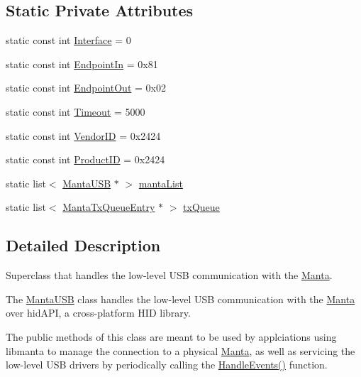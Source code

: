 \subsection*{\-Static \-Private \-Attributes}
\begin{DoxyCompactItemize}
\item 
static const int \hyperlink{classMantaUSB_acde414c7e155d869f5c399518e32d38d}{\-Interface} = 0
\item 
static const int \hyperlink{classMantaUSB_afe5ae885264a5aff980c5c645a3ff9d6}{\-Endpoint\-In} = 0x81
\item 
static const int \hyperlink{classMantaUSB_ab3926f81d0c1b5993d583a34343e0b6d}{\-Endpoint\-Out} = 0x02
\item 
static const int \hyperlink{classMantaUSB_aa2a88b5675ef513922f1bd4748d12181}{\-Timeout} = 5000
\item 
static const int \hyperlink{classMantaUSB_ad3b9f90c7681710d99dd984000a7859e}{\-Vendor\-I\-D} = 0x2424
\item 
static const int \hyperlink{classMantaUSB_aa78f9ab72991bc6ed711e6b823e98a00}{\-Product\-I\-D} = 0x2424
\item 
static list$<$ \hyperlink{classMantaUSB}{\-Manta\-U\-S\-B} $\ast$ $>$ \hyperlink{classMantaUSB_a6c2c001a6d17abfd0f6ab6a6d36ce288}{manta\-List}
\item 
static list$<$ \hyperlink{structMantaUSB_1_1MantaTxQueueEntry}{\-Manta\-Tx\-Queue\-Entry} $\ast$ $>$ \hyperlink{classMantaUSB_ab647636b02371d10ccedaf719b6b7de2}{tx\-Queue}
\end{DoxyCompactItemize}


\subsection{\-Detailed \-Description}
\-Superclass that handles the low-\/level \-U\-S\-B communication with the \hyperlink{classManta}{\-Manta}. 

\-The \hyperlink{classMantaUSB}{\-Manta\-U\-S\-B} class handles the low-\/level \-U\-S\-B communication with the \hyperlink{classManta}{\-Manta} over hid\-A\-P\-I, a cross-\/platform \-H\-I\-D library.

\-The public methods of this class are meant to be used by applciations using libmanta to manage the connection to a physical \hyperlink{classManta}{\-Manta}, as well as servicing the low-\/level \-U\-S\-B drivers by periodically calling the \hyperlink{classMantaUSB_a4d55c1c1d9e769ce7a0ef532a72221e8}{\-Handle\-Events()} function. 

